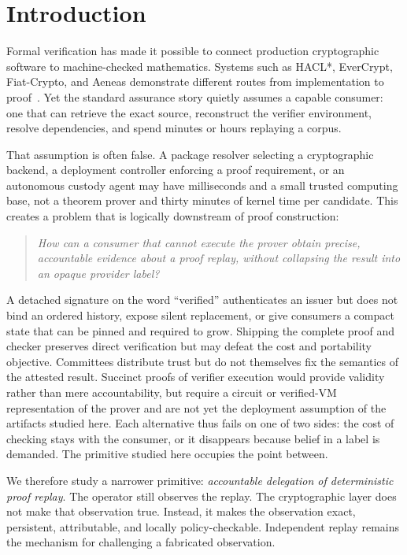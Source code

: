 \documentclass[11pt]{article}
\theoremstyle{remark}
\begin{document}
\section{Introduction}\label{sec:intro}

Formal verification has made it possible to connect production cryptographic
software to machine-checked mathematics. Systems such as HACL*, EverCrypt,
Fiat-Crypto, and Aeneas demonstrate different routes from implementation to
proof~\cite{hacl,evercrypt,fiatcrypto,aeneas}. Yet the standard assurance story
quietly assumes a capable consumer: one that can retrieve the exact source,
reconstruct the verifier environment, resolve dependencies, and spend minutes
or hours replaying a corpus.

That assumption is often false. A package resolver selecting a cryptographic
backend, a deployment controller enforcing a proof requirement, or an
autonomous custody agent may have milliseconds and a small trusted computing
base, not a theorem prover and thirty minutes of kernel time per candidate.
This creates a problem that is logically downstream of proof construction:

\begin{quote}
\emph{How can a consumer that cannot execute the prover obtain precise,
accountable evidence about a proof replay, without collapsing the result into
an opaque provider label?}
\end{quote}

A detached signature on the word ``verified'' authenticates an issuer but does
not bind an ordered history, expose silent replacement, or give consumers a
compact state that can be pinned and required to grow. Shipping the complete
proof and checker preserves direct verification but may defeat the cost and
portability objective. Committees distribute trust but do not themselves fix
the semantics of the attested result. Succinct proofs of verifier execution
would provide validity rather than mere accountability, but require a circuit or
verified-VM representation of the prover and are not yet the deployment
assumption of the artifacts studied here. Each alternative thus fails on
one of two sides: the cost of checking stays with the consumer, or it
disappears because belief in a label is demanded. The primitive studied
here occupies the point between.

We therefore study a narrower primitive: \emph{accountable delegation of
deterministic proof replay}. The operator still observes the replay. The
cryptographic layer does not make that observation true. Instead, it makes the
observation exact, persistent, attributable, and locally policy-checkable.
Independent replay remains the mechanism for challenging a fabricated
observation.
\end{document}
